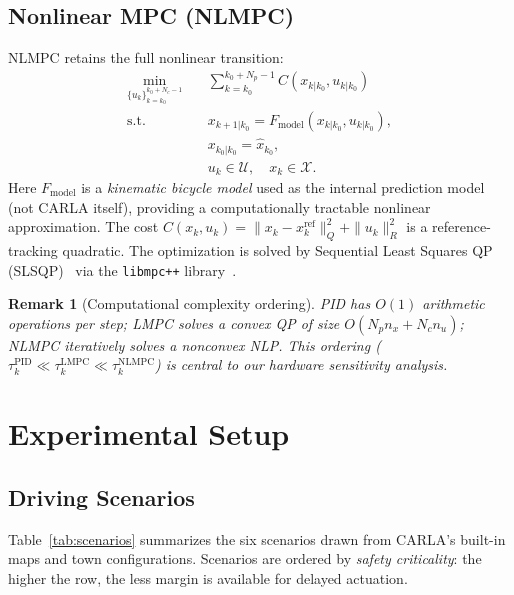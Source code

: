 \documentclass[conference]{IEEEtran}
\newtheorem{remark}{Remark}
\begin{document}
\subsection{Nonlinear MPC (NLMPC)}

NLMPC retains the full nonlinear transition:
\begin{align}
  \min_{\{u_k\}_{k=k_0}^{k_0+N_c-1}} \quad&
    \sum_{k=k_0}^{k_0+N_p-1} C(x_{k|k_0}, u_{k|k_0})
    \label{eq:nlmpc_cost}\\
  \mathrm{s.t.}\quad & x_{k+1|k_0} =
    F_{\mathrm{model}}(x_{k|k_0}, u_{k|k_0}), \nonumber\\
  & x_{k_0|k_0} = \hat{x}_{k_0},\nonumber\\
  & u_k \in \mathcal{U},\quad x_k \in \mathcal{X}. \nonumber
\end{align}
Here $F_{\mathrm{model}}$ is a \emph{kinematic bicycle model} used
as the internal prediction model (not CARLA itself), providing a
computationally tractable nonlinear approximation.  The cost
$C(x_k, u_k) = \|x_k - x_k^{\mathrm{ref}}\|_Q^2 +
\|u_k\|_R^2$ is a reference-tracking quadratic.  The optimization
is solved by Sequential Least Squares QP (SLSQP)~\cite{kraft1988slsqp}
via the \texttt{libmpc++} library~\cite{piccinelli_libmpc}.

\begin{remark}[Computational complexity ordering]
  PID has $O(1)$ arithmetic operations per step; LMPC solves a convex QP
  of size $O(N_p n_x + N_c n_u)$; NLMPC iteratively solves a nonconvex
  NLP.  This ordering ($\tau_k^{\mathrm{PID}} \ll
  \tau_k^{\mathrm{LMPC}} \ll \tau_k^{\mathrm{NLMPC}}$) is central to
  our hardware sensitivity analysis.
\end{remark}

\section{Experimental Setup}\label{sec:experiments}

\subsection{Driving Scenarios}

Table~\ref{tab:scenarios} summarizes the six scenarios drawn from
CARLA's built-in maps and town configurations.  Scenarios are ordered
by \emph{safety criticality}: the higher the row, the less margin is
available for delayed actuation.
\end{document}
